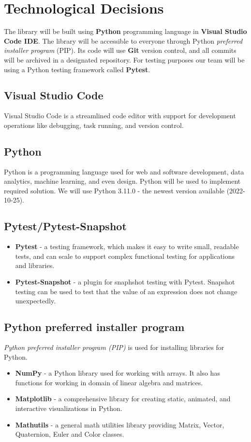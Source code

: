 \documentclass[a4paper,12pt,fleqn]{article}
\begin{document}
\newpage
\section{Technological Decisions}
The library will be built using \textbf{Python} programming language in \textbf{Visual Studio Code IDE}. The library will be accessible to everyone through Python \textit{preferred installer program} (PIP). Its code will use \textbf{Git} version control, and all commits will be archived in a designated repository.\newline
For testing purposes our team will be using a Python testing framework called \textbf{Pytest}. 

\subsection{Visual Studio Code}
Visual Studio Code is a streamlined code editor with support for development operations like debugging, task running, and version control.

\subsection{Python}
Python is a programming language used for web and software development, data analytics, machine learning, and even design. Python will be used to implement required solution. We will use Python 3.11.0 - the newest version available (2022-10-25).

\subsection{Pytest/Pytest-Snapshot}


\begin{itemize}
    \item \textbf{Pytest} - a testing framework, which makes it easy to write small, readable tests, and can scale to support complex functional testing for applications and libraries.
    \item \textbf{Pytest-Snapshot} - a plugin for snaphshot testing with Pytest.
    Snapshot testing can be used to test that the value of an expression does not change unexpectedly.
\end{itemize}

\subsection{Python preferred installer program}
\textit{Python preferred installer program (PIP)} is used for installing libraries for Python.
\begin{itemize}
    \item \textbf{NumPy} - a Python library used for working with arrays. It also has functions for working in domain of linear algebra and matrices.
    \item \textbf{Matplotlib} - a comprehensive library for creating static, animated, and interactive visualizations in Python.
    \item \textbf{Mathutils} - a general math utilities library providing Matrix, Vector, Quaternion, Euler and Color classes.
\end{itemize}
\end{document}
